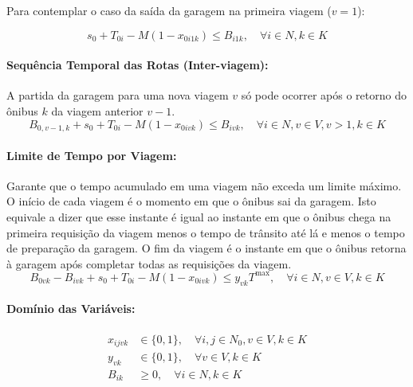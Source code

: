 \documentclass[12pt, a4paper]{article}
\begin{document}
\noindent Para contemplar o caso da saída da garagem na primeira viagem ($v=1$):

\begin{equation}
    s_0 + T_{0i} - M(1 - x_{0i1k}) \le B_{i1k}, \quad \forall i \in N, k \in K
\end{equation}

\paragraph{Sequência Temporal das Rotas (Inter-viagem):} A partida da garagem para uma nova viagem $v$ só pode ocorrer após o retorno do ônibus $k$ da viagem anterior $v-1$.
\begin{equation}
    B_{0,v-1,k} + s_0 + T_{0i} - M(1 - x_{0ivk}) \le B_{ivk}, \quad \forall i \in N, v \in V, v > 1, k \in K
\end{equation}

\paragraph{Limite de Tempo por Viagem:} Garante que o tempo acumulado em uma viagem não exceda um limite máximo. O início de cada viagem é o momento em que o ônibus sai da garagem. Isto equivale a dizer que esse instante é igual ao instante em que o ônibus chega na primeira requisição da viagem menos o tempo de trânsito até lá e menos o tempo de preparação da garagem. O fim da viagem é o instante em que o ônibus retorna à garagem após completar todas as requisições da viagem.
\begin{equation}
B_{0vk} - B_{ivk} + s_0 + T_{0i} - M (1 - x_{0ivk}) \le y_{vk} T^{\max}, \quad \forall i \in N, v \in V, k \in K
\end{equation}

\paragraph{Domínio das Variáveis:}
\begin{align}
x_{ijvk} &\in \{0, 1\}, \quad \forall i,j \in N_0, v \in V, k \in K \\
y_{vk} &\in \{0, 1\}, \quad \forall v \in V, k \in K \\
B_{ik} &\ge 0, \quad \forall i \in N, k \in K
\end{align}

% 
% 
\end{document}
